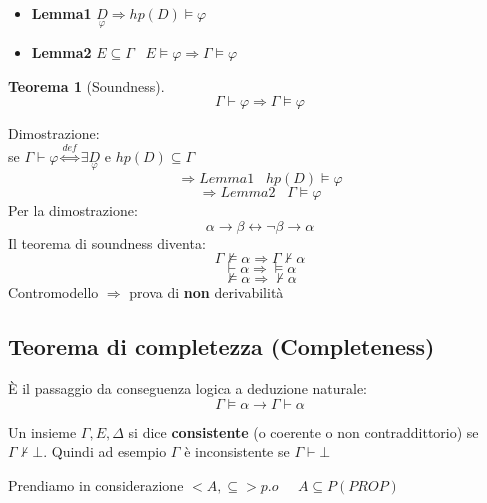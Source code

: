 \documentclass{article}
\newtheorem{theorem}{Teorema}
\theoremstyle{break}
\theoremstyle{break}
\theoremstyle{break}
\theoremstyle{break}
\begin{document}
\begin{itemize}
  \item \textbf{Lemma1} \( \underset{\varphi}{D} \Rightarrow hp(D) \models \varphi \)
  \item \textbf{Lemma2} \( E \subseteq \Gamma\;\;\; E \models \varphi \Rightarrow \Gamma \models \varphi \)
\end{itemize}

\begin{theorem} [Soundness]
  \[
  \Gamma \vdash \varphi \Rightarrow \Gamma \models \varphi
  \] 
\end{theorem}
Dimostrazione:\\
se \( \Gamma \vdash \varphi \stackrel{def}{\Leftrightarrow} \exists \underset{\varphi}{D} \) e \( hp(D) \subseteq \Gamma \)  
\[
  \Rightarrow Lemma1\;\;\; hp(D) \models \varphi
\] 
\[
\Rightarrow Lemma2\;\;\; \Gamma \models \varphi
\] 
Per la dimostrazione:
\[
  \alpha \to \beta \leftrightarrow \neg \beta \to \alpha
\] 
Il teorema di soundness diventa:
\[
\Gamma \not\models \alpha \Rightarrow \Gamma \not\vdash \alpha
\]
\[
\vdash \alpha \Rightarrow \models \alpha
\] 
\[
\not\models \alpha \Rightarrow \not\vdash \alpha
\] 
Contromodello \( \Rightarrow \) prova di \textbf{non} derivabilità

\subsection{Teorema di completezza (Completeness)}
È il passaggio da conseguenza logica a deduzione naturale: 
\[
    \Gamma \models \alpha \to  \Gamma \vdash \alpha 
\] 
\begin{definition}
  Un insieme \( \Gamma, E, \Delta \) si dice \textbf{consistente} (o coerente o non contraddittorio)
  se \( \Gamma \not\vdash \bot \). Quindi ad esempio \( \Gamma \) è inconsistente se
  \( \Gamma \vdash \bot \) 
\end{definition}
Prendiamo in considerazione \(<A, \subseteq> p.o\;\;\;\;\; A \subseteq P(PROP) \) 
\end{document}
